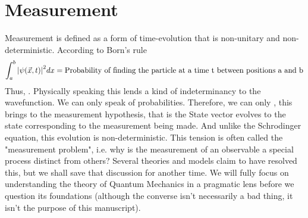 \section{Measurement}
Measurement is defined as a form of time-evolution that is non-unitary and non-deterministic. 
According to Born's rule
\begin{equation}
	\int_{a}^{b} \abs{\psi(\vec{x}, t)}^{2} dx = \text{Probability of finding the particle at a time t between positions a and b}
\end{equation}
Thus, . Physically speaking this lends a kind of indeterminancy to the wavefunction. We can only speak of probabilities. Therefore, we can only , this brings to the measurement hypothesis, that is the State vector evolves to the state corresponding to the measurement being made. And unlike the Schrodinger equation, this evolution is non-deterministic. This tension is often called the "measurement problem", i.e. why is the measurement of an observable a special process distinct from others? Several theories and models claim to have resolved this, but we shall save that discussion for another time. We will fully focus on understanding the theory of Quantum Mechanics in a pragmatic lens before we question its foundations (although the converse isn't necessarily a bad thing, it isn't the purpose of this manuscript).

